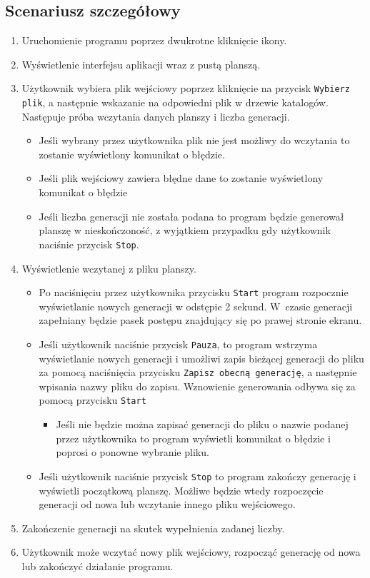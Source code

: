 \documentclass[a4paper,11pt, notitlepage ]{article}
\begin{document}
\subsection{Scenariusz szczegółowy}
\begin{enumerate}
\item Uruchomienie programu poprzez dwukrotne kliknięcie ikony.
\item Wyświetlenie interfejsu aplikacji wraz z pustą planszą.
\item Użytkownik wybiera plik wejściowy poprzez kliknięcie na przycisk \verb+Wybierz+ \verb+plik+, a następnie wskazanie na odpowiedni plik w drzewie katalogów. Następuje próba wczytania danych planszy i liczba generacji.
\begin{itemize}
\item Jeśli wybrany przez użytkownika plik nie jest możliwy do wczytania to zostanie wyświetlony komunikat o błędzie.
\item Jeśli plik wejściowy zawiera błędne dane to zostanie wyświetlony komunikat o błędzie
\item Jeśli liczba generacji nie została podana to program będzie generował planszę w nieskończoność, z wyjątkiem przypadku gdy użytkownik naciśnie przycisk \verb+Stop+.
\end{itemize}
\item Wyświetlenie wczytanej z pliku planszy.
\begin{itemize}
\item Po naciśnięciu przez użytkownika przycisku \verb+Start+ program rozpocznie wyświetlanie nowych generacji w odstępie 2 sekund. W~czasie generacji zapełniany będzie pasek postępu znajdujący się po prawej stronie ekranu.
\item Jeśli użytkownik naciśnie przycisk \verb+Pauza+, to program wstrzyma wyświetlanie nowych generacji i umożliwi zapis bieżącej generacji do pliku za pomocą naciśnięcia przycisku \verb+Zapisz obecną generację+, a następnie wpisania nazwy pliku do zapisu. Wznowienie generowania odbywa się za pomocą przycisku \verb+Start+
\begin{itemize}
\item Jeśli nie będzie można zapisać generacji do pliku o nazwie podanej przez użytkownika to program wyświetli komunikat o błędzie i poprosi o ponowne wybranie pliku.
\end{itemize}
\item Jeśli użytkownik naciśnie przycisk \verb+Stop+ to program zakończy generację i wyświetli początkową planszę. Możliwe będzie wtedy rozpoczęcie generacji od nowa lub wczytanie innego pliku wejściowego.
\end{itemize}
\item Zakończenie generacji na skutek wypełnienia zadanej liczby.
\item Użytkownik może wczytać nowy plik wejściowy, rozpocząć generację od nowa lub zakończyć działanie programu.
\end{enumerate}
\end{document}
